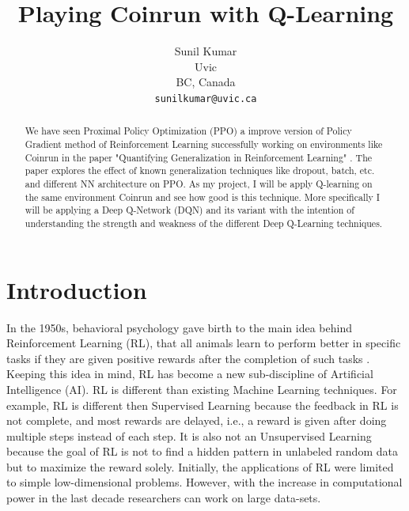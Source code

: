 \documentclass[10pt,twocolumn,letterpaper]{article}
\begin{document}
\title{Playing Coinrun with Q-Learning}

\author{Sunil Kumar\\
Uvic\\
BC, Canada\\
{\tt\small sunilkumar@uvic.ca}
}

\maketitle

\begin{abstract}
   We have seen Proximal Policy Optimization (PPO) a improve version of Policy Gradient method of Reinforcement Learning successfully working on environments like Coinrun in the paper "Quantifying Generalization in Reinforcement Learning" \cite{cobbe_quantifying_2018}. The paper explores the effect of known generalization techniques like dropout, batch, etc. and different NN architecture on PPO. As my project, I will be apply Q-learning on the same environment Coinrun and see how good is this technique. More specifically I will be applying a Deep Q-Network (DQN) and its variant with the intention of understanding the strength and weakness of the different Deep Q-Learning techniques. 
\end{abstract}

\section{Introduction}


In the 1950s, behavioral psychology gave birth to the main idea behind Reinforcement Learning (RL), that all animals learn to perform better in specific tasks if they are given positive rewards after the completion of such tasks \cite{Sutton1988ReinforcementLA}. Keeping this idea in mind, RL has become a new sub-discipline of Artificial Intelligence (AI). RL is different than existing Machine Learning techniques. For example, RL is different then Supervised Learning because the feedback in RL is not complete, and most rewards are delayed, i.e., a reward is given after doing multiple steps instead of each step. It is also not an Unsupervised Learning because the goal of RL is not to find a hidden pattern in unlabeled random data but to maximize the reward solely. Initially, the applications of RL were limited to simple low-dimensional problems. However, with the increase in computational power in the last decade researchers can work on large data-sets.
\end{document}
